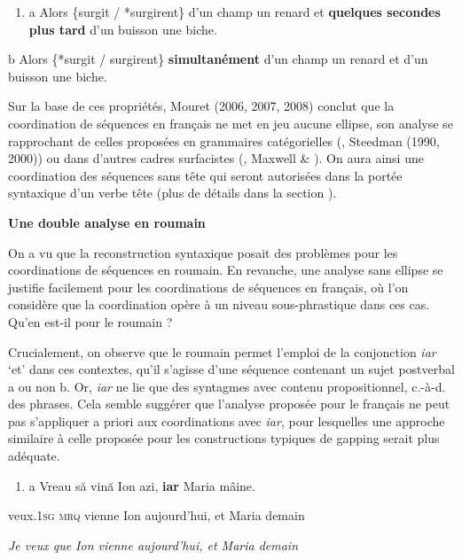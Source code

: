 \begin{enumerate}
\item \label{bkm:Ref290311643}a   Alors \{surgit / *surgirent\} d'un champ un renard et \textbf{quelques secondes plus tard} d'un buisson une biche. 


\end{enumerate}
  b  Alors \{*surgit / surgirent\} \textbf{simultanément} d'un champ un renard et d'un buisson une biche.  

Sur la base de ces propriétés, Mouret (2006, 2007, 2008) conclut que la coordination de séquences en français ne met en jeu aucune ellipse, son analyse se rapprochant de celles proposées en grammaires catégorielles (\citet{Dowty1988}, Steedman (1990, 2000)) ou dans d'autres cadres surfacistes (\citet{Hudson1988}, Maxwell \& \citet{Manning1996}). On aura ainsi une coordination des séquences sans tête qui seront autorisées dans la portée syntaxique d'un verbe tête (plus de détails dans la section ).

{\bfseries
\label{bkm:Ref299980366}Une double analyse en roumain}

On a vu que la reconstruction syntaxique posait des problèmes pour les coordinations de séquences en roumain. En revanche, une analyse sans ellipse se justifie facilement pour les coordinations de séquences en français, où l'on considère que la coordination opère à un niveau sous-phrastique dans ces cas. Qu'en est-il pour le roumain ?

Crucialement, on observe que le roumain permet l'emploi de la conjonction \textit{iar} `et' dans ces contextes, qu'il s'agisse d'une séquence contenant un sujet postverbal a ou non b. Or, \textit{iar} ne lie que des syntagmes avec contenu propositionnel, c.-à-d. des phrases. Cela semble suggérer que l'analyse proposée pour le français ne peut pas s'appliquer a priori aux coordinations avec \textit{iar}, pour lesquelles une approche similaire à celle proposée pour les constructions typiques de gapping serait plus adéquate.  


\begin{enumerate}
\item \label{bkm:Ref290312953}a  Vreau să vină Ion azi, \textbf{iar} Maria mâine.


\end{enumerate}
veux.\textsc{1sg} \textsc{mrq} vienne Ion aujourd'hui, et Maria demain

{\itshape
Je veux que Ion vienne aujourd'hui, et Maria demain}

